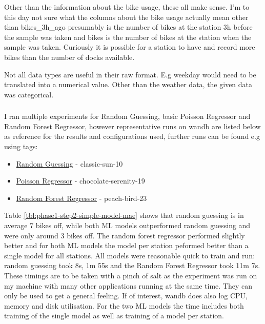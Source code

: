 \documentclass[a4paper]{article}
\begin{document}
    Other than the information about the bike usage, these all make sense. I'm to this day not sure what the columns
    about the bike usage actually mean other than bikes\_3h\_ago presumably is the number of bikes at the station 3h
    before the sample was taken and bikes is the number of bikes at the station when the sample was taken. Curiously it
    is possible for a station to have and record more bikes than the number of docks available.

    Not all data types are useful in their raw format. E.g weekday would need to be translated into a numerical value.
    Other than the weather data, the given data was categorical.

    \subsubsection*{}

    I ran multiple experiments for Random Guessing, basic Poisson Regressor and Random Forest Regressor, however
    representative runs on wandb are listed below as reference for the results and configurations used, further runs can
    be found e.g using tags:
    \begin{itemize}
        \item \href{https://wandb.ai/idegen/mlp-2021/runs/3k64fgcw/overview?workspace=user-idegen}{Random Guessing} - classic-sun-10
        \item \href{https://wandb.ai/idegen/mlp-2021/runs/1iyx8zmh/overview?workspace=user-idegen}{Poisson Regressor} - chocolate-serenity-19
        \item \href{https://wandb.ai/idegen/mlp-2021/runs/25zvoihx/overview?workspace=user-idegen}{Random Forest Regressor} - peach-bird-23
    \end{itemize}

    Table \ref{tbl:phase1-step2-simple-model-mae} shows that random guessing is in average 7 bikes off, while both ML models
    outperformed random guessing and were only around 3 bikes off. The random forest regressor performed slightly better and
    for both ML models the model per station peformed better than a single model for all stations. All models
    were reasonable quick to train and run: random guessing took 8s, 1m 55s and the Random Forest Regressor took 11m 7s.
    These timings are to be taken with a pinch of salt as the experiment was run on my machine with many other applications
    running at the same time. They can only be used to get a general feeling. If of interest, wandb does
    also log CPU, memory and disk utilisation. For the two ML models the time includes both training of the single model
    as well as training of a model per station.
\end{document}
